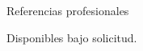 
\prefix{}
\begin{rubric}{Referencias profesionales}

{\large Disponibles bajo solicitud.\par}
\end{rubric}